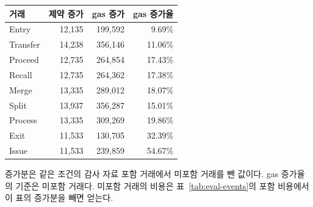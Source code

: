 \begin{center}
\begin{minipage}{\columnwidth}
\centering\small\captionsetup{hypcap=false}
\label{tab:eval-audit}
\begin{tabular*}{\columnwidth}{@{\extracolsep{\fill}}lrrr@{}}
\toprule
거래 & 제약 증가 & gas 증가 & gas 증가율 \\ \midrule
Entry & 12,135 & 199,592 & 9.69\% \\
Transfer & 14,238 & 356,146 & 11.06\% \\
Proceed & 12,735 & 264,854 & 17.43\% \\
Recall & 12,735 & 264,362 & 17.38\% \\
Merge & 13,335 & 289,012 & 18.07\% \\
Split & 13,937 & 356,287 & 15.01\% \\
Process & 13,335 & 309,269 & 19.86\% \\
Exit & 11,533 & 130,705 & 32.39\% \\
Issue & 11,533 & 239,859 & 54.67\% \\
\bottomrule
\end{tabular*}
\par\smallskip\begin{minipage}{\columnwidth}\footnotesize
증가분은 같은 조건의 감사 자료 포함 거래에서 미포함 거래를 뺀 값이다.
gas 증가율의 기준은 미포함 거래다. 미포함 거래의 비용은
표~\ref{tab:eval-events}의 포함 비용에서 이 표의 증가분을 빼면 얻는다.
\end{minipage}
\end{minipage}
\end{center}
